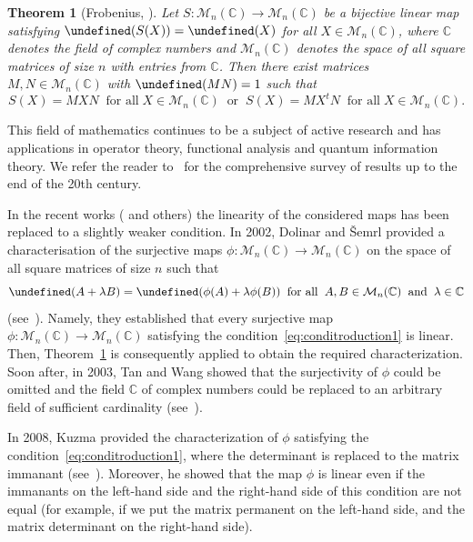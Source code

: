 \documentclass{elsarticle}
\let\det\undefined
\DeclareMathOperator{\det}{det}
\def\M{{\mathcal M}}
\newtheorem{theorem}{Theorem}[section]
\theoremstyle{definition}
\numberwithin{equation}{section}
\begin{document}
\begin{theorem}[Frobenius, {\cite[, Theorem I]{GF}}]\label{thm:frobeniusthm}
Let $S\colon \M_{n}(\mathbb C) \to \M_{n}(\mathbb C)$ be a bijective linear map satisfying $\det (S(X))=\det (X)$ for all $X \in \M_{n} (\mathbb C)$, where $\mathbb C$ denotes the field of complex numbers and $\M_{n} (\mathbb C)$ denotes the space of all square matrices of size $n$ with entries from $\mathbb C$. Then there exist matrices $M, N \in \M_n(\mathbb C)$ with $\det (MN) = 1$ such that
$$S(X) = MXN\;\;\mbox{for all}\; X \in \M_{n} (\mathbb C)
\;\;\text{or}\;\;
S(X) = MX^{t}N\;\;\mbox{for all}\; X \in \M_{n}(\mathbb C).$$
\end{theorem}

This field of mathematics continues to be a subject of active research and has applications in  operator theory, functional analysis and quantum information theory. We refer the reader to~\cite{LAMA199233} for the comprehensive survey  of results up to the end of the 20th century.

In the recent works (\cite{Dolinar2002,TAN2003311,Kuzma2008,Costara2021} and others) the linearity of the considered maps has been replaced to a slightly weaker condition. In 2002, Dolinar and \v{S}emrl provided a characterisation of the surjective maps $\phi \colon \M_n(\mathbb C) \to \M_n(\mathbb C)$ on the space of all square matrices of size $n$ such that
\begin{equation}\label{eq:conditroduction1}
\det (A + \lambda B) = \det (\phi (A) + \lambda \phi (B))\;\;\mbox{for all}\;\;A, B \in \M_n(\mathbb C)\;\;\mbox{and}\;\;\lambda \in \mathbb C
\end{equation}
(see~\cite{Dolinar2002}). Namely, they established that every surjective map $\phi \colon \M_n(\mathbb C) \to \M_n(\mathbb C)$ satisfying the condition~\eqref{eq:conditroduction1} is linear. Then, Theorem~\ref{thm:frobeniusthm} is consequently applied to obtain the required characterization. Soon after, in 2003, Tan and Wang showed that the surjectivity of $\phi$ could be omitted and the field $\mathbb C$ of complex numbers could be replaced to an arbitrary field of sufficient cardinality (see~\cite{TAN2003311}).

In 2008, Kuzma provided the characterization of $\phi$ satisfying the condition~\eqref{eq:conditroduction1}, where the determinant is replaced to the matrix immanant (see~\cite{Kuzma2008}). Moreover, he showed that the map $\phi$ is linear even if the immanants on the left-hand side and the right-hand side of this condition are not equal (for example, if we put the matrix permanent on the left-hand side, and the matrix determinant on the right-hand side).
\end{document}
